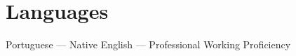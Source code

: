 \section*{Languages}

\noindent Portuguese --- Native \hfill English --- Professional Working Proficiency
